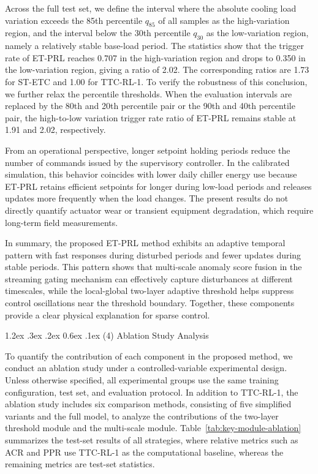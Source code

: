\documentclass[preprint,12pt]{elsarticle}
\makeatletter
\renewcommand\paragraph{\@startsection{paragraph}{4}{\z@}%
  {1.2ex \@plus .3ex \@minus .2ex}%
  {0.6ex \@plus .1ex}%
  {\normalfont\normalsize}}
\makeatother
\begin{document}
Across the full test set, we define the interval where the absolute cooling load variation exceeds the 85th percentile \(q_{85}\) of all samples as the high-variation region, and the interval below the 30th percentile \(q_{30}\) as the low-variation region, namely a relatively stable base-load period. The statistics show that the trigger rate of ET-PRL reaches 0.707 in the high-variation region and drops to 0.350 in the low-variation region, giving a ratio of 2.02. The corresponding ratios are 1.73 for ST-ETC and 1.00 for TTC-RL-1. To verify the robustness of this conclusion, we further relax the percentile thresholds. When the evaluation intervals are replaced by the 80th and 20th percentile pair or the 90th and 40th percentile pair, the high-to-low variation trigger rate ratio of ET-PRL remains stable at 1.91 and 2.02, respectively.

From an operational perspective, longer setpoint holding periods reduce the number of commands issued by the supervisory controller. In the calibrated simulation, this behavior coincides with lower daily chiller energy use because ET-PRL retains efficient setpoints for longer during low-load periods and releases updates more frequently when the load changes. The present results do not directly quantify actuator wear or transient equipment degradation, which require long-term field measurements.

In summary, the proposed ET-PRL method exhibits an adaptive temporal pattern with fast responses during disturbed periods and fewer updates during stable periods. This pattern shows that multi-scale anomaly score fusion in the streaming gating mechanism can effectively capture disturbances at different timescales, while the local-global two-layer adaptive threshold helps suppress control oscillations near the threshold boundary. Together, these components provide a clear physical explanation for sparse control.

\paragraph{(4) Ablation Study Analysis}\label{ablation-study-analysis}

To quantify the contribution of each component in the proposed method, we conduct an ablation study under a controlled-variable experimental design. Unless otherwise specified, all experimental groups use the same training configuration, test set, and evaluation protocol. In addition to TTC-RL-1, the ablation study includes six comparison methods, consisting of five simplified variants and the full model, to analyze the contributions of the two-layer threshold module and the multi-scale module. Table~\ref{tab:key-module-ablation} summarizes the test-set results of all strategies, where relative metrics such as ACR and PPR use TTC-RL-1 as the computational baseline, whereas the remaining metrics are test-set statistics.
\end{document}
